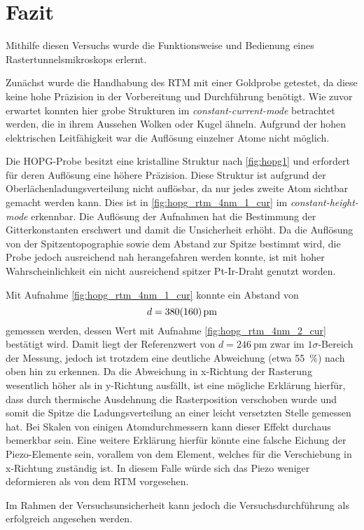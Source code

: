 \section{Fazit}\label{sec:fazit}
Mithilfe diesen Versuchs wurde die Funktionsweise und Bedienung eines Rastertunnelsmikroskops 
erlernt.\\\par
Zunächst wurde die Handhabung des RTM mit einer Goldprobe getestet, da diese keine hohe 
Präzision in der Vorbereitung und Durchführung benötigt. Wie zuvor 
erwartet konnten hier grobe Strukturen im \emph{constant-current-mode} betrachtet werden, 
die in ihrem Aussehen Wolken oder Kugel ähneln. Aufgrund der hohen elektrischen 
Leitfähigkeit war die Auflösung einzelner Atome nicht möglich.\\\par
Die HOPG-Probe besitzt eine kristalline Struktur nach \cref{fig:hopg1} und erfordert
für deren Auflösung eine höhere Präzision. Diese Struktur ist aufgrund 
der Oberlächenladungsverteilung nicht auflösbar, da nur jedes zweite Atom sichtbar gemacht 
werden kann. Dies ist in \cref{fig:hopg_rtm_4nm_1_cur} im \emph{constant-height-mode} 
erkennbar. Die Auflösung der Aufnahmen hat die Bestimmung der Gitterkonstanten erschwert und 
damit die Unsicherheit erhöht. Da die Auflösung von der Spitzentopographie sowie dem Abstand 
zur Spitze bestimmt wird, die Probe jedoch ausreichend nah herangefahren werden konnte, 
ist mit hoher Wahrscheinlichkeit ein nicht ausreichend spitzer Pt-Ir-Draht genutzt worden.\par 
Mit Aufnahme \cref{fig:hopg_rtm_4nm_1_cur} konnte ein Abstand von 
\[d = \SI{380\pm 160}{\pm}\]
gemessen werden, dessen Wert mit Aufnahme \cref{fig:hopg_rtm_4nm_2_cur} bestätigt wird. Damit 
liegt der Referenzwert von $d = \SI{246}{\pm}$ \cite{rtm-leitpfaden} zwar im $1\sigma$-Bereich der 
Messung, jedoch ist trotzdem eine deutliche Abweichung (etwa \SI{55}{\percent}) nach oben hin zu erkennen. Da die Abweichung 
in x-Richtung der Rasterung wesentlich höher als in y-Richtung ausfällt, ist eine mögliche Erklärung 
hierfür, dass durch thermische Ausdehnung die Rasterposition verschoben wurde und somit 
die Spitze die Ladungsverteilung an einer leicht versetzten Stelle gemessen hat. Bei Skalen von einigen
Atomdurchmessern kann dieser Effekt durchaus bemerkbar sein. Eine weitere Erklärung hierfür könnte
eine falsche Eichung der Piezo-Elemente sein, vorallem von dem Element, welches für 
die Verschiebung in x-Richtung zuständig ist. In diesem Falle würde sich das Piezo 
weniger deformieren als von dem RTM vorgesehen. \par
Im Rahmen der Versuchsunsicherheit kann jedoch die Versuchsdurchführung als erfolgreich 
angesehen werden.